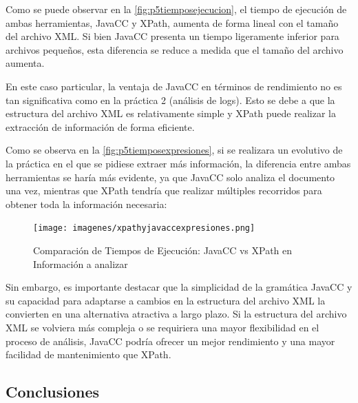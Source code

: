 Como se puede observar en la \autoref{fig:p5tiemposejecucion}, el tiempo de ejecución de ambas herramientas, JavaCC y XPath, aumenta de forma lineal con el tamaño del archivo XML. Si bien JavaCC presenta un tiempo ligeramente inferior para archivos pequeños, esta diferencia se reduce a medida que el tamaño del archivo aumenta.

En este caso particular, la ventaja de JavaCC en términos de rendimiento no es tan significativa como en la práctica 2 (análisis de logs). Esto se debe a que la estructura del archivo XML es relativamente simple y XPath puede realizar la extracción de información de forma eficiente.


Como se observa en la \autoref{fig:p5tiemposexpresiones}, si se realizara un evolutivo de la práctica en el que se pidiese extraer más información, la diferencia entre ambas herramientas se haría más evidente, ya que JavaCC solo analiza el documento una vez, mientras que XPath tendría que realizar múltiples recorridos para obtener toda la información necesaria:

\begin{figure}[H]
	\centering
	\texttt{[image: imagenes/xpathyjavaccexpresiones.png]}
	\caption{\label{fig:p5tiemposexpresiones}Comparación de Tiempos de Ejecución: JavaCC vs XPath en Información a analizar}
\end{figure}


Sin embargo, es importante destacar que la simplicidad de la gramática JavaCC y su capacidad para adaptarse a cambios en la estructura del archivo XML la convierten en una alternativa atractiva a largo plazo. Si la estructura del archivo XML se volviera más compleja o se requiriera una mayor flexibilidad en el proceso de análisis, JavaCC podría ofrecer un mejor rendimiento y una mayor facilidad de mantenimiento que XPath.

\subsection{Conclusiones}

